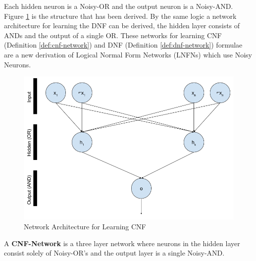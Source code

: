\noindent
\begin{minipage}[t]{0.35\textwidth}
	\vspace{0px}
\hspace{0.0\textwidth}
Each hidden neuron is a Noisy-OR and the output neuron is a Noisy-AND. Figure \ref{fig:cnf-network-structure} is the structure that has been derived. By the same logic a network architecture for learning the DNF can be derived, the hidden layer consists of ANDs and the output of a single OR. These networks for learning CNF (Definition \ref{def:cnf-network}) and DNF (Definition \ref{def:dnf-network}) formulae are a new derivation of Logical Normal Form Networks (LNFNs) \cite{herrmann1996backpropagation} which use Noisy Neurons.
\end{minipage}
\hspace{0.045\textwidth}
\begin{minipage}[t]{0.55\textwidth}
	\vspace{0px}
	\begin{figure}[H]
	\centering
	\begin{minipage}[b]{1.0\textwidth}
		\includegraphics[width=\textwidth]{CNF-Network-Structure.png}
		\caption{Network Architecture for Learning CNF}
		\label{fig:cnf-network-structure}
	\end{minipage}
	\hfill
\end{figure}
\end{minipage}

\theoremstyle{definition}
\begin{definition} \label{def:cnf-network}
A \textbf{CNF-Network} is a three layer network where neurons in the hidden layer consist solely of Noisy-OR's and the output layer is a single Noisy-AND. 
\end{definition}

